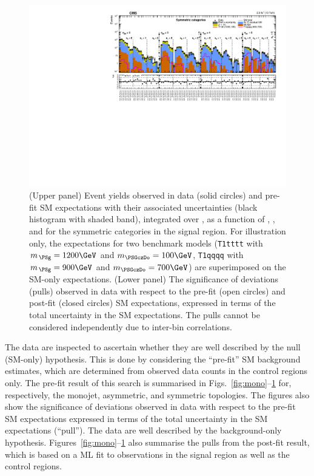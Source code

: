 \begin{figure}[!htb]
  \centering
    \includegraphics[width=\cmsFigWidthTwo]{Figure_005.pdf}
    \caption{(Upper panel) Event yields observed in data (solid
      circles) and pre-fit SM expectations with their associated
      uncertainties (black histogram with shaded band), integrated
      over \HTmiss, as a function of \njet, \nb, and \scalht for the
      symmetric \njet categories in the signal region. For
      illustration only, the expectations for two benchmark models
      (\texttt{T1tttt} with $m_{\,\PSg} = 1200\GeV$ and $m_{\PSGczDo}
      = 100\GeV$, \texttt{T1qqqq} with $m_{\,\PSg} = 900\GeV$ and
      $m_{\PSGczDo} = 700\GeV$) are superimposed on the SM-only
      expectations. (Lower panel) The significance of deviations
      (pulls) observed in data with respect to the pre-fit (open
      circles) and post-fit (closed circles) SM expectations,
      expressed in terms of the total uncertainty in the SM
      expectations. The pulls cannot be considered independently due
      to inter-bin correlations.}
    \label{fig:sym}
\end{figure}


The data are inspected to ascertain whether they are well described by
the null (SM-only) hypothesis. This is done by considering the
``pre-fit'' SM background estimates, which are determined from
observed data counts in the control regions only. The pre-fit result
of this search is summarised in Figs.~\ref{fig:mono}--\ref{fig:sym}
for, respectively, the monojet, asymmetric, and symmetric
topologies. The figures also show the significance of deviations
observed in data with respect to the pre-fit SM expectations expressed
in terms of the total uncertainty in the SM expectations
(``pull''). The data are well described by the background-only
hypothesis. Figures~\ref{fig:mono}--\ref{fig:sym} also summarise the
pulls from the post-fit result, which is based on a ML fit to
observations in the signal region as well as the control regions.

